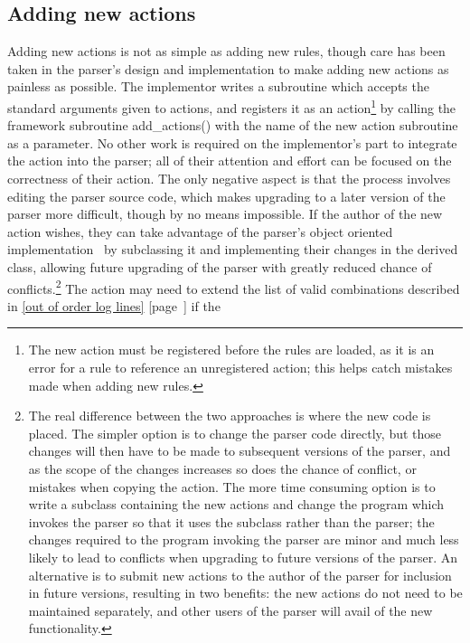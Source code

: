 \documentclass[a4paper,12pt,draft]{article}
\newcommand{\refwithpage}[1]{%
    \empty{}\ref{#1} [page~\pageref{#1}]%
}
\newcommand{\sectionref}[1]{%
    \textsection{}\refwithpage{#1}%
}
\begin{document}
\subsection{Adding new actions}

\label{adding new actions}

Adding new actions is not as simple as adding new rules, though care has
been taken in the parser's design and implementation to make adding new
actions as painless as possible.  The implementor writes a subroutine which
accepts the standard arguments given to actions, and registers it as an
action\footnote{The new action must be registered before the rules are
loaded, as it is an error for a rule to reference an unregistered action;
this helps catch mistakes made when adding new rules.} by calling the
framework subroutine add\_actions() with the name of the new action
subroutine as a parameter.  No other work is required on the implementor's
part to integrate the action into the parser; all of their attention and
effort can be focused on the correctness of their action.  The only
negative aspect is that the process involves editing the parser source
code, which makes upgrading to a later version of the parser more
difficult, though by no means impossible.  If the author of the new action
wishes, they can take advantage of the parser's object oriented
implementation~\cite{Wikipedia-object-orientation} by subclassing it and
implementing their changes in the derived class, allowing future upgrading
of the parser with greatly reduced chance of conflicts.\footnote{The real
difference between the two approaches is where the new code is placed.  The
simpler option is to change the parser code directly, but those changes
will then have to be made to subsequent versions of the parser, and as the
scope of the changes increases so does the chance of conflict, or mistakes
when copying the action.  The more time consuming option is to write a
subclass containing the new actions and change the program which invokes
the parser so that it uses the subclass rather than the parser; the changes
required to the program invoking the parser are minor and much less likely
to lead to conflicts when upgrading to future versions of the parser.  An
alternative is to submit new actions to the author of the parser for
inclusion in future versions, resulting in two benefits: the new actions do
not need to be maintained separately, and other users of the parser will
avail of the new functionality.} The action may need to extend the list of
valid combinations described in \sectionref{out of order log lines} if the
\end{document}

